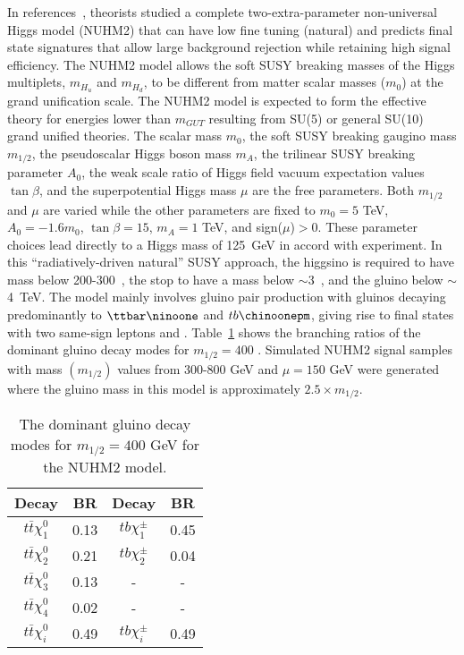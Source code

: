In references~\cite{Baer:2013xua,Baer:2013yha,Baer:2016usl}, 
theorists studied a complete two-extra-parameter non-universal Higgs model (NUHM2) 
that can have low fine tuning (natural) and
predicts final state signatures that allow large background rejection while retaining high 
signal efficiency. 
The NUHM2 model allows the soft SUSY breaking masses of the Higgs multiplets, $m_{H_{u}}$ and $m_{H_{d}}$, to be different from 
matter scalar masses ($m_{0}$) at the grand unification scale. The NUHM2 model is expected to form the effective theory for energies 
lower than $m_{GUT}$ resulting from SU(5) or general SU(10) grand unified theories.
The scalar mass $m_{0}$, the soft SUSY breaking gaugino mass $m_{1/2}$, the pseudoscalar Higgs boson mass $m_{A}$, the trilinear SUSY breaking parameter $A_{0}$, the weak scale ratio of Higgs field vacuum expectation values $\tan\beta$, and the superpotential Higgs mass $\mu$ are the free parameters.
Both $m_{1/2}$ and $\mu$ are varied while the other parameters are fixed to $m_{0} = 5$ TeV, $A_{0} = -1.6m_{0}$, $\tan\beta = 15$, $m_{A} = 1$ TeV, and sign($\mu$)$>$0. 
These parameter choices lead directly to a Higgs mass of 125~GeV in accord with experiment.  In this ``radiatively-driven natural'' SUSY approach, the higgsino is
required to have mass below 200-300~\GeV, the stop to have a mass below
$\sim$3~\TeV, and the gluino below $\sim$4~TeV.
The model mainly involves gluino pair production with gluinos decaying 
predominantly to $\ttbar\ninoone$ and $tb\chinoonepm$, giving rise to final 
states with two same-sign leptons and \met.
Table~\ref{tab:NUHM2} shows the branching ratios of the dominant gluino decay modes for $m_{1/2} = 400$ \GeV.
Simulated NUHM2 signal samples with mass $(m_{1/2})$ values from 300-800 GeV and $\mu = 150$ GeV were generated where 
the gluino mass in this model is approximately $2.5\times m_{1/2}$.

\begin{table}[t!]
\begin{center}
\begin{tabular}{|c|c||c|c|}
\hline
\hline
Decay & BR & Decay & BR\\
\hline
$t\bar{t}\chi^{0}_{1}$ & 0.13 & $tb\chi^{\pm}_{1}$ & 0.45\\
$t\bar{t}\chi^{0}_{2}$ & 0.21 & $tb\chi^{\pm}_{2}$ & 0.04\\
$t\bar{t}\chi^{0}_{3}$ & 0.13 & - & - \\
$t\bar{t}\chi^{0}_{4}$ & 0.02 & - & - \\
\hline
$t\bar{t}\chi^{0}_{i}$ & 0.49 & $tb\chi^{\pm}_{i}$ & 0.49\\
\hline
\hline
\end{tabular}
\caption{The dominant gluino decay modes for $m_{1/2} = 400$ GeV for the NUHM2 model.}
\label{tab:NUHM2}
\end{center}
\end{table}

